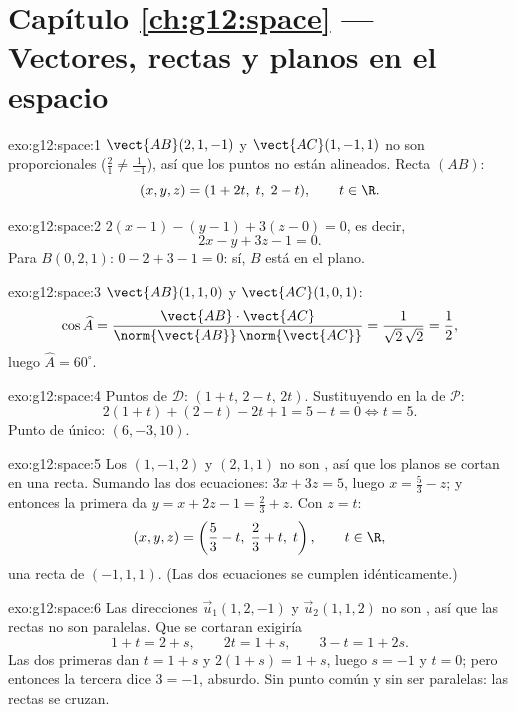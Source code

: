 \section*{Capítulo \ref{ch:g12:space} --- Vectores, rectas y planos en el espacio}

\begin{solution}{exo:g12:space:1}
$\vect{AB}(2, 1, -1)$ y $\vect{AC}(1, -1, 1)$ no son proporcionales
($\frac21 \neq \frac{1}{-1}$), así que los puntos no están alineados. Recta
$(AB)$:
\[
(x, y, z) = (1 + 2t,\; t,\; 2 - t), \qquad t \in \R .
\]
\end{solution}

\begin{solution}{exo:g12:space:2}
$2(x - 1) - (y - 1) + 3(z - 0) = 0$, es decir,
\[
2x - y + 3z - 1 = 0 .
\]
Para $B(0,2,1)$: $0 - 2 + 3 - 1 = 0$: sí, $B$ está en el plano.
\end{solution}

\begin{solution}{exo:g12:space:3}
$\vect{AB}(1,1,0)$ y $\vect{AC}(1,0,1)$:
\[
\cos\widehat{A}
= \frac{\vect{AB}\cdot\vect{AC}}{\norm{\vect{AB}}\,\norm{\vect{AC}}}
= \frac{1}{\sqrt2\,\sqrt2} = \frac12,
\]
luego $\widehat A = 60^\circ$.
\end{solution}

\begin{solution}{exo:g12:space:4}
Puntos de $\mathcal D$: $(1 + t,\, 2 - t,\, 2t)$. Sustituyendo en la
 de $\mathcal P$:
\[
2(1+t) + (2 - t) - 2t + 1 = 5 - t = 0 \iff t = 5 .
\]
Punto de  único: $(6, -3, 10)$.
\end{solution}

\begin{solution}{exo:g12:space:5}
Los  $(1, -1, 2)$ y $(2, 1, 1)$ no son , así que
los planos se cortan en una recta. Sumando las dos ecuaciones:
$3x + 3z = 5$, luego $x = \frac53 - z$; y entonces la primera  da
$y = x + 2z - 1 = \frac23 + z$. Con $z = t$:
\[
(x, y, z) = \left(\frac53 - t,\; \frac23 + t,\; t\right), \qquad t \in \R,
\]
una recta de  $(-1, 1, 1)$. (Las dos ecuaciones se cumplen
idénticamente.)
\end{solution}

\begin{solution}{exo:g12:space:6}
Las direcciones $\vec u_1(1, 2, -1)$ y $\vec u_2(1, 1, 2)$ no son
, así que las rectas no son paralelas. Que se cortaran exigiría
\[
1 + t = 2 + s, \qquad 2t = 1 + s, \qquad 3 - t = 1 + 2s .
\]
Las dos primeras dan $t = 1 + s$ y $2(1+s) = 1 + s$, luego $s = -1$ y
$t = 0$; pero entonces la tercera dice $3 = -1$, absurdo. Sin punto común y
sin ser paralelas: las rectas se cruzan.
\end{solution}

